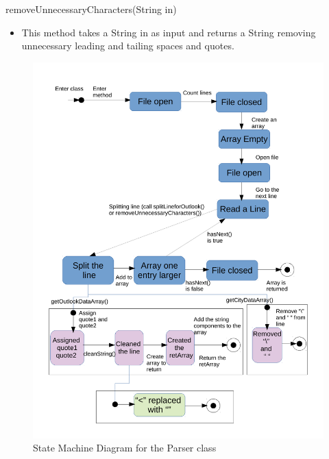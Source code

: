 \documentclass[12pt,fleqn]{article}
\begin{document}
\noindent removeUnnecessaryCharacters(String in)
\begin{itemize}
\item This method takes a String in as input and returns a String removing unnecessary leading and tailing spaces and quotes.
\end{itemize}

\begin{figure}[hp]
\caption{State Machine Diagram for the Parser class}
 \includegraphics[width =\linewidth, scale=0.25]{statediagram_parser.pdf}
\end{figure}


\newpage
\end{document}
